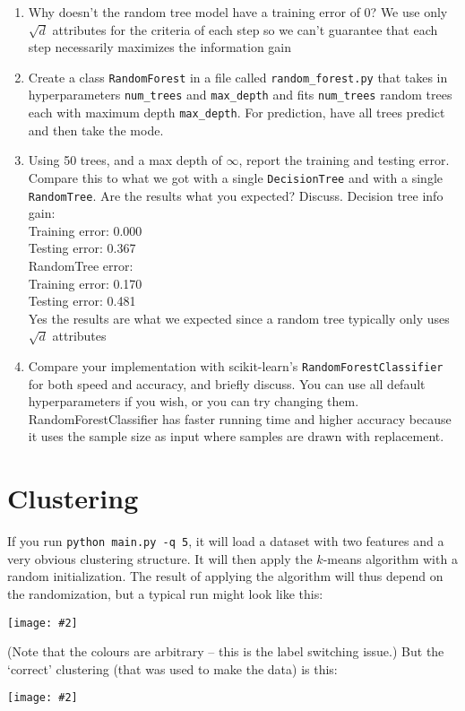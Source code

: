 \documentclass{article}
\def\blu#1{{\color{blu}#1}}
\def\red#1{{\color{red}#1}}
\newcommand{\centerfig}[2]{\begin{center}\texttt{[image: \#2]}\end{center}}
\def\enum#1{\begin{enumerate}#1\end{enumerate}}
\begin{document}
\blu{
\enum{
\item Why doesn't the random tree model have a training error of 0? \red{We use only $\sqrt{d}$ attributes for the criteria of each step so we can't guarantee that each step necessarily maximizes the information gain}
\item Create a class \texttt{RandomForest} in a file called \texttt{random\string_forest.py} that takes in hyperparameters \texttt{num\string_trees} and \texttt{max\string_depth} and
fits \texttt{num\string_trees} random trees each with maximum depth \texttt{max\string_depth}. For prediction, have all trees predict and then take the mode.
\item Using 50 trees, and a max depth of $\infty$, report the training and testing error. Compare this to what we got with a single \texttt{DecisionTree} and with a single \texttt{RandomTree}. Are the results what you expected? Discuss. \red{Decision tree info gain: \\
    Training error: 0.000 \\
    Testing error: 0.367 \\
RandomTree error: \\
    Training error: 0.170 \\
    Testing error: 0.481 \\
    Yes the results are what we expected since a random tree typically only uses $\sqrt{d}$ attributes}
\item Compare your implementation with scikit-learn's \texttt{RandomForestClassifier} for both speed and accuracy, and briefly discuss. You can use all default hyperparameters if you wish, or you can try changing them.
\red{RandomForestClassifier has faster running time and higher accuracy because it uses the sample size as input where samples are drawn with replacement.}
}
}

\section{Clustering}

If you run \verb|python main.py -q 5|, it will load a dataset with two features
and a very obvious clustering structure. It will then apply the $k$-means algorithm
with a random initialization. The result of applying the
algorithm will thus depend on the randomization, but a typical run might look like this:
\centerfig{.5}{./figs/kmeans_basic.png}
(Note that the colours are arbitrary -- this is the label switching issue.)
But the `correct' clustering (that was used to make the data) is this:
\centerfig{.5}{./figs/kmeans_good.png}
\end{document}
